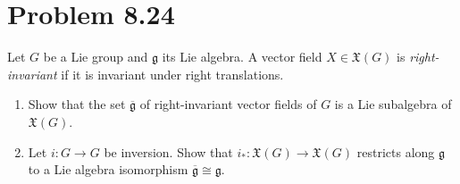\documentclass[11pt, letterpaper]{article}
\begin{document}
\section{Problem 8.24}
\begin{problem}
	Let $G$ be a Lie group and $\mathfrak{g} $ its Lie algebra. A vector field $X\in \mathfrak{X} (G)$ is \emph{right-invariant} if it is invariant under right translations.
	\begin{enumerate}
		\item Show that the set $\overline{\mathfrak{g} } $ of right-invariant vector fields of $G$ is a Lie subalgebra of $\mathfrak{X} (G)$.
		\item Let $i : G \to G$ be inversion. Show that $i_* : \mathfrak{X} (G) \to \mathfrak{X} (G)$ restricts along $\mathfrak{g} $ to a Lie algebra isomorphism $\overline{\mathfrak{g} } \cong \mathfrak{g} $.
	\end{enumerate}
\end{problem}
\end{document}
